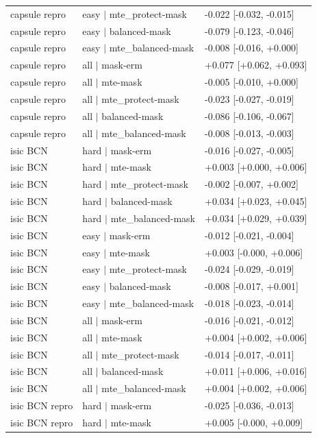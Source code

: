 \begin{table}[H]
\begin{tabular}{lll}
capsule repro & easy $|$ mte\_protect-mask & -0.022 [-0.032, -0.015] \\
capsule repro & easy $|$ balanced-mask & -0.079 [-0.123, -0.046] \\
capsule repro & easy $|$ mte\_balanced-mask & -0.008 [-0.016, +0.000] \\
capsule repro & all $|$ mask-erm & +0.077 [+0.062, +0.093] \\
capsule repro & all $|$ mte-mask & -0.005 [-0.010, +0.000] \\
capsule repro & all $|$ mte\_protect-mask & -0.023 [-0.027, -0.019] \\
capsule repro & all $|$ balanced-mask & -0.086 [-0.106, -0.067] \\
capsule repro & all $|$ mte\_balanced-mask & -0.008 [-0.013, -0.003] \\
isic BCN & hard $|$ mask-erm & -0.016 [-0.027, -0.005] \\
isic BCN & hard $|$ mte-mask & +0.003 [+0.000, +0.006] \\
isic BCN & hard $|$ mte\_protect-mask & -0.002 [-0.007, +0.002] \\
isic BCN & hard $|$ balanced-mask & +0.034 [+0.023, +0.045] \\
isic BCN & hard $|$ mte\_balanced-mask & +0.034 [+0.029, +0.039] \\
isic BCN & easy $|$ mask-erm & -0.012 [-0.021, -0.004] \\
isic BCN & easy $|$ mte-mask & +0.003 [-0.000, +0.006] \\
isic BCN & easy $|$ mte\_protect-mask & -0.024 [-0.029, -0.019] \\
isic BCN & easy $|$ balanced-mask & -0.008 [-0.017, +0.001] \\
isic BCN & easy $|$ mte\_balanced-mask & -0.018 [-0.023, -0.014] \\
isic BCN & all $|$ mask-erm & -0.016 [-0.021, -0.012] \\
isic BCN & all $|$ mte-mask & +0.004 [+0.002, +0.006] \\
isic BCN & all $|$ mte\_protect-mask & -0.014 [-0.017, -0.011] \\
isic BCN & all $|$ balanced-mask & +0.011 [+0.006, +0.016] \\
isic BCN & all $|$ mte\_balanced-mask & +0.004 [+0.002, +0.006] \\
isic BCN repro & hard $|$ mask-erm & -0.025 [-0.036, -0.013] \\
isic BCN repro & hard $|$ mte-mask & +0.005 [-0.000, +0.009] \\

\end{tabular}
\end{table}

